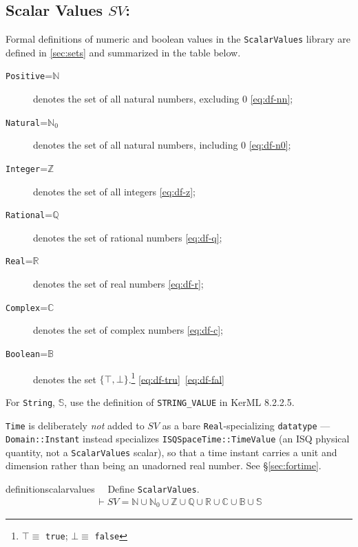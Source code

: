 \subsection{Scalar Values $SV$:}\label{sec:scalarvalues}

Formal definitions of numeric and boolean values in the \texttt{ScalarValues} library are defined in \ref{sec:sets} and summarized in the table below.
\begin{description}
\item[\texttt{Positive}=$\mathbb{N}$] denotes the set of all natural numbers, excluding 0 \ref{eq:df-nn}; 
\item[\texttt{Natural}=$\mathbb{N}_0$] denotes the set of all natural numbers, including 0 \ref{eq:df-n0}; 
\item[\texttt{Integer}=$\mathbb{Z}$] denotes the set of all integers \ref{eq:df-z}; 
\item[\texttt{Rational}=$\mathbb{Q}$] denotes the set of rational numbers \ref{eq:df-q};  
\item[\texttt{Real}=$\mathbb{R}$] denotes the set of real numbers \ref{eq:df-r};
\item[\texttt{Complex}=$\mathbb{C}$] denotes the set of complex numbers \ref{eq:df-c};
\item[\texttt{Boolean}=$\mathbb{B}$] denotes the set \(\{\top, \bot\}\).\footnote{$\top \equiv$ \texttt{true}; $\bot \equiv$ \texttt{false}} \ref{eq:df-tru}~\ref{eq:df-fal}
\end{description}
For \texttt{String}, $\mathbb{S}$, use the definition of \texttt{STRING\_VALUE}  in KerML 8.2.2.5.

\texttt{Time} is deliberately \emph{not} added to $SV$ as a bare \texttt{Real}-specializing \texttt{datatype}
--- \texttt{Domain::Instant} instead specializes \texttt{ISQSpaceTime::TimeValue} (an ISQ physical quantity,
not a \texttt{ScalarValues} scalar), so that a time instant carries a unit and dimension rather than being an
unadorned real number. See \S\ref{sec:fortime}.


\begin{restatable}{definition}{scalarvalues}~~ Define \texttt{ScalarValues}.
\begin{align}
\vdash SV = \mathbb{N} \cup \mathbb{N}_0 \cup \mathbb{Z} \cup \mathbb{Q} \cup \mathbb{R} \cup \mathbb{C} \cup \mathbb{B} \cup \mathbb{S} \label{eq:df-scalarvalues}\tag{df-scalarvalues}
\end{align}
\end{restatable}



